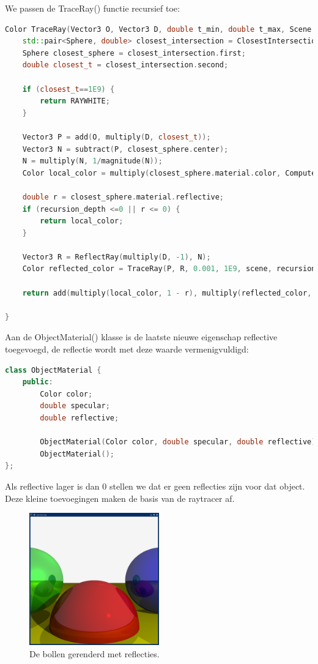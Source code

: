 \documentclass[12pt, a4paper]{article}
\begin{document}
We passen de TraceRay() functie recursief toe:
\begin{lstlisting}[language=C++]
Color TraceRay(Vector3 O, Vector3 D, double t_min, double t_max, Scene scene, int recursion_depth) {   
    std::pair<Sphere, double> closest_intersection = ClosestIntersection(O, D, t_min, t_max, scene);
    Sphere closest_sphere = closest_intersection.first;
    double closest_t = closest_intersection.second;

    if (closest_t==1E9) {
        return RAYWHITE;
    }

    Vector3 P = add(O, multiply(D, closest_t));
    Vector3 N = subtract(P, closest_sphere.center);
    N = multiply(N, 1/magnitude(N));
    Color local_color = multiply(closest_sphere.material.color, ComputeLighting(P, N, multiply(D, -1), closest_sphere.material.specular, scene));

    double r = closest_sphere.material.reflective;
    if (recursion_depth <=0 || r <= 0) {
        return local_color;
    }

    Vector3 R = ReflectRay(multiply(D, -1), N);
    Color reflected_color = TraceRay(P, R, 0.001, 1E9, scene, recursion_depth - 1);

    return add(multiply(local_color, 1 - r), multiply(reflected_color, r)); 

}
\end{lstlisting}

Aan de ObjectMaterial() klasse is de laatste nieuwe eigenschap reflective toegevoegd, de reflectie wordt met deze waarde vermenigvuldigd:

\begin{lstlisting}[language=C++]
class ObjectMaterial {
    public: 
        Color color;
        double specular;
        double reflective;

        ObjectMaterial(Color color, double specular, double reflective);
        ObjectMaterial();
};
\end{lstlisting}

Als reflective lager is dan 0 stellen we dat er geen reflecties zijn voor dat object. Deze kleine toevoegingen maken de basis van de raytracer af.

\begin{figure}[H]
    \centering
    \includegraphics[width=0.50\textwidth]{renders/reflection.png}
    \caption{De bollen gerenderd met reflecties.}
    \label{fig:reflection}
\end{figure}
\end{document}
